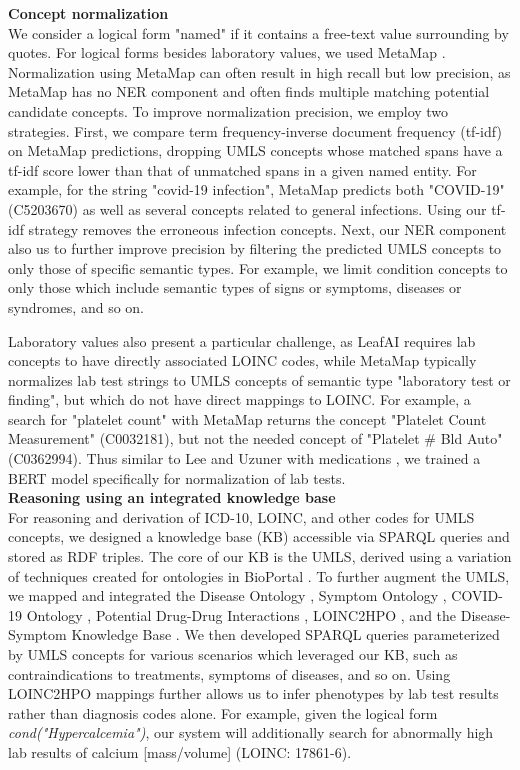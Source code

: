 \documentclass[../main.tex]{subfiles}
\begin{document}
\noindent \textbf{Concept normalization} \\
We consider a logical form "named" if it contains a free-text value surrounding by quotes. For logical forms besides laboratory values, we used MetaMap \cite{aronson2001effective}. Normalization using MetaMap can often result in high recall but low precision, as MetaMap has no NER component and often finds multiple matching potential candidate concepts. To improve normalization precision, we employ two strategies. First, we compare term frequency-inverse document frequency (tf-idf) on MetaMap predictions, dropping UMLS concepts whose matched spans have a tf-idf score lower than that of unmatched spans in a given named entity. For example, for the string "covid-19 infection", MetaMap predicts both "COVID-19" (C5203670) as well as several concepts related to general infections. Using our tf-idf strategy removes the erroneous infection concepts. Next, our NER component also us to further improve precision by filtering the predicted UMLS concepts to only those of specific semantic types. For example, we limit condition concepts to only those which include semantic types of signs or symptoms, diseases or syndromes, and so on. 

Laboratory values also present a particular challenge, as LeafAI requires lab concepts to have directly associated LOINC codes, while MetaMap typically normalizes lab test strings to UMLS concepts of semantic type "laboratory test or finding", but which do not have direct mappings to LOINC. For example, a search for "platelet count" with MetaMap returns the concept "Platelet Count Measurement" (C0032181), but not the needed concept of "Platelet \# Bld Auto" (C0362994). Thus similar to Lee and Uzuner with medications \cite{lee2020normalizing}, we trained a BERT model specifically for normalization of lab tests. \\

\noindent \textbf{Reasoning using an integrated knowledge base} \\
\noindent For reasoning and derivation of ICD-10, LOINC, and other codes for UMLS concepts, we designed a knowledge base (KB) accessible via SPARQL queries and stored as RDF triples. The core of our KB is the UMLS, derived using a variation of techniques created for ontologies in BioPortal \cite{noy2009bioportal}. To further augment the UMLS, we mapped and integrated the Disease Ontology \cite{schriml2012disease}, Symptom Ontology \cite{sayers2010database}, COVID-19 Ontology \cite{sargsyan2020covid}, Potential Drug-Drug Interactions \cite{ayvaz2015toward}, LOINC2HPO \cite{zhang2019semantic}, and the Disease-Symptom Knowledge Base \cite{wang2008automated}. We then developed SPARQL queries parameterized by UMLS concepts for various scenarios which leveraged our KB, such as contraindications to treatments, symptoms of diseases, and so on. Using LOINC2HPO mappings further allows us to infer phenotypes by lab test results rather than diagnosis codes alone. For example, given the logical form \textit{cond("Hypercalcemia")}, our system will additionally search for abnormally high lab results of calcium [mass/volume] (LOINC: 17861-6).
\end{document}
